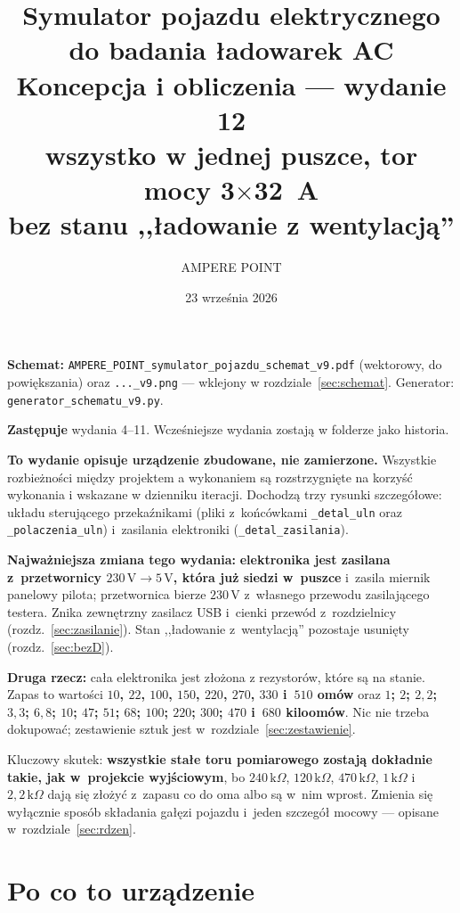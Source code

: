 \documentclass[a4paper,11pt]{article}
\title{\vspace{-1.5cm}Symulator pojazdu elektrycznego do badania ładowarek AC\\[2mm]
\large Koncepcja i obliczenia --- wydanie 12\\[1mm]
\normalsize wszystko w jednej puszce, tor mocy 3$\times$32~A\\[1mm]
\normalsize bez stanu ,,ładowanie z wentylacją''}
\author{AMPERE POINT}
\date{23 września 2026}
\newcommand{\kohm}{\,\mathrm{k}\Omega}
\newcommand{\volt}{\,\mathrm{V}}
\begin{document}
\maketitle
\thispagestyle{empty}

\noindent\textbf{Schemat:} \texttt{AMPERE\_POINT\_symulator\_pojazdu\_schemat\_v9.pdf}
(wektorowy, do powiększania) oraz \texttt{...\_v9.png} --- wklejony w rozdziale~\ref{sec:schemat}.
Generator: \texttt{generator\_schematu\_v9.py}.

\noindent\textbf{Zastępuje} wydania 4--11. Wcześniejsze wydania zostają w folderze jako
historia.

\noindent\textbf{To wydanie opisuje urządzenie zbudowane, nie zamierzone.} Wszystkie
rozbieżności między projektem a wykonaniem są rozstrzygnięte na korzyść wykonania
i wskazane w dzienniku iteracji. Dochodzą trzy rysunki szczegółowe: układu
sterującego przekaźnikami (pliki z~końcówkami \texttt{\_detal\_uln} oraz
\texttt{\_polaczenia\_uln}) i~zasilania elektroniki (\texttt{\_detal\_zasilania}).

\noindent\textbf{Najważniejsza zmiana tego wydania:} \textbf{elektronika jest zasilana
z~przetwornicy $230\volt\to5\volt$, która już siedzi w~puszce} i~zasila miernik panelowy
pilota; przetwornica bierze $230\volt$ z~własnego przewodu zasilającego testera.
Znika zewnętrzny zasilacz USB i~cienki przewód z~rozdzielnicy (rozdz.~\ref{sec:zasilanie}).
Stan ,,ładowanie z~wentylacją'' pozostaje usunięty (rozdz.~\ref{sec:bezD}).

\noindent\textbf{Druga rzecz:} cała elektronika jest złożona z rezystorów, które
są na stanie. Zapas to wartości \textbf{$10$, $22$, $100$, $150$, $220$, $270$, $330$
i~$510$ omów} oraz \textbf{$1$; $2$; $2{,}2$; $3{,}3$; $6{,}8$; $10$; $47$; $51$; $68$;
$100$; $220$; $300$; $470$ i~$680$ kiloomów}. Nic nie trzeba dokupować; zestawienie sztuk
jest w~rozdziale~\ref{sec:zestawienie}.

\noindent Kluczowy skutek: \textbf{wszystkie stałe toru pomiarowego zostają dokładnie takie,
jak w~projekcie wyjściowym}, bo $240\kohm$, $120\kohm$, $470\kohm$, $1\kohm$ i~$2{,}2\kohm$
dają się złożyć z~zapasu co do oma albo są w~nim wprost. Zmienia się wyłącznie sposób
składania gałęzi pojazdu i~jeden szczegół mocowy --- opisane w~rozdziale~\ref{sec:rdzen}.

\tableofcontents

\section{Po co to urządzenie}
\end{document}
